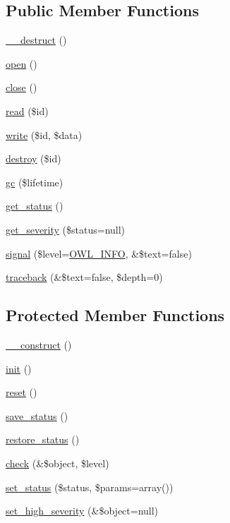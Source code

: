 \subsection*{Public Member Functions}
\begin{DoxyCompactItemize}
\item 
\hyperlink{classSessionHandler_a461097c3ee6b1aecf833ce1225d02329}{\_\-\_\-destruct} ()
\item 
\hyperlink{classSessionHandler_a50aa0b123f53d99de350a0eb02b4bfa5}{open} ()
\item 
\hyperlink{classSessionHandler_a335ced83731c7e3e685b7e0df2989c79}{close} ()
\item 
\hyperlink{classSessionHandler_a58cc3e5bf5b14e7bfbc73162de1f5d2b}{read} (\$id)
\item 
\hyperlink{classSessionHandler_ab59071ef0d3deee2472c6916471bd9f5}{write} (\$id, \$data)
\item 
\hyperlink{classSessionHandler_a4e43712ef307979de1b12039ef801adb}{destroy} (\$id)
\item 
\hyperlink{classSessionHandler_ac33097332375ae3f8a43c31cef6db0e8}{gc} (\$lifetime)
\item 
\hyperlink{class__OWL_a99ec771fa2c5c279f80152cc09e489a8}{get\_\-status} ()
\item 
\hyperlink{class__OWL_adf9509ef96858be7bdd9414c5ef129aa}{get\_\-severity} (\$status=null)
\item 
\hyperlink{class__OWL_a51ba4a16409acf2a2f61f286939091a5}{signal} (\$level=\hyperlink{owl_8severitycodes_8php_a139328861128689f2f4def6a399d9057}{OWL\_\-INFO}, \&\$text=false)
\item 
\hyperlink{class__OWL_aa29547995d6741b7d2b90c1d4ea99a13}{traceback} (\&\$text=false, \$depth=0)
\end{DoxyCompactItemize}
\subsection*{Protected Member Functions}
\begin{DoxyCompactItemize}
\item 
\hyperlink{classSessionHandler_a546ba6d31a1ce532de13f65aadc3be0e}{\_\-\_\-construct} ()
\item 
\hyperlink{class__OWL_ae0ef3ded56e8a6b34b6461e5a721cd3e}{init} ()
\item 
\hyperlink{class__OWL_a2f2a042bcf31965194c03033df0edc9b}{reset} ()
\item 
\hyperlink{class__OWL_a9e49b9c76fbc021b244c6915ea536d71}{save\_\-status} ()
\item 
\hyperlink{class__OWL_a465eeaf40edd9f9c848841700c32ce55}{restore\_\-status} ()
\item 
\hyperlink{class__OWL_ad6f4f6946f40199dd0333cf219fa500e}{check} (\&\$object, \$level)
\item 
\hyperlink{class__OWL_aea912d0ede9b3c2a69b79072d94d4787}{set\_\-status} (\$status, \$params=array())
\item 
\hyperlink{class__OWL_a576829692a3b66e3d518853bf43abae3}{set\_\-high\_\-severity} (\&\$object=null)
\end{DoxyCompactItemize}

